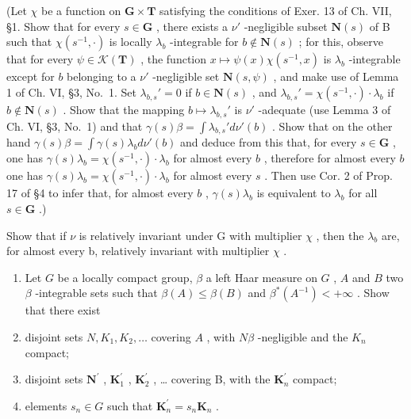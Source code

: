 (Let \(\chi\) be a function on \(\mathbf{G} \times \mathbf{T}\) satisfying the conditions of Exer. 13 of Ch. VII, §1. Show that for every \(s \in \mathbf{G}\) , there exists a \(\nu'\) -negligible subset \(\mathbf{N}(s)\) of B such that \(\chi(s^{-1}, \cdot)\) is locally \(\lambda_b\) -integrable for \(b \notin \mathbf{N}(s)\) ; for this, observe that for every \(\psi \in \mathcal{K}(\mathbf{T})\) , the function \(x \mapsto \psi(x)\chi(s^{-1}, x)\) is \(\lambda_b\) -integrable except for \(b\) belonging to a \(\nu'\) -negligible set \(\mathbf{N}(s, \psi)\) , and make use of Lemma 1 of Ch. VI, §3, No.~1. Set \(\lambda_{b,s}' = 0\) if \(b \in \mathbf{N}(s)\) , and \(\lambda_{b,s}' = \chi(s^{-1}, \cdot) \cdot \lambda_b\) if \(b \notin \mathbf{N}(s)\) . Show that the mapping \(b \mapsto \lambda_{b,s}'\) is \(\nu'\) -adequate (use Lemma 3 of Ch. VI, §3, No.~1) and that \(\gamma(s)\beta = \int \lambda_{b,s}' d\nu'(b)\) . Show that on the other hand \(\gamma(s)\beta = \int \gamma(s)\lambda_b d\nu'(b)\) and deduce from this that, for every \(s \in \mathbf{G}\) , one has \(\gamma(s)\lambda_b = \chi(s^{-1}, \cdot) \cdot \lambda_b\) for almost every \(b\) , therefore for almost every \(b\) one has \(\gamma(s)\lambda_b = \chi(s^{-1}, \cdot) \cdot \lambda_b\) for almost every \(s\) . Then use Cor. 2 of Prop. 17 of §4 to infer that, for almost every \(b\) , \(\gamma(s)\lambda_b\) is equivalent to \(\lambda_b\) for all \(s \in \mathbf{G}\) .)

Show that if \(\nu\) is relatively invariant under G with multiplier \(\chi\) , then the \(\lambda_{b}\) are, for almost every b, relatively invariant with multiplier \(\chi\) .

\begin{enumerate}
\def\labelenumi{\arabic{enumi})}
\setcounter{enumi}{8}
\item
  Let \(G\) be a locally compact group, \(\beta\) a left Haar measure on \(G\) , \(A\) and \(B\) two \(\beta\) -integrable sets such that \(\beta(A) \leqslant \beta(B)\) and \(\beta^{*}(A^{-1}) < +\infty\) . Show that there exist
\item
  disjoint sets \(N, K_{1}, K_{2}, \ldots\) covering \(A\) , with \(N \beta\) -negligible and the \(K_{n}\) compact;
\item
  disjoint sets \(\mathbf{N}^{\prime}\) , \(\mathbf{K}_1^{\prime}\) , \(\mathbf{K}_2^{\prime}\) , \ldots{} covering B, with the \(\mathbf{K}_n^{\prime}\) compact;\\
\item
  elements \(s_n \in G\) such that \(\mathbf{K}_n^{\prime} = s_n\mathbf{K}_n\) .
\end{enumerate}

